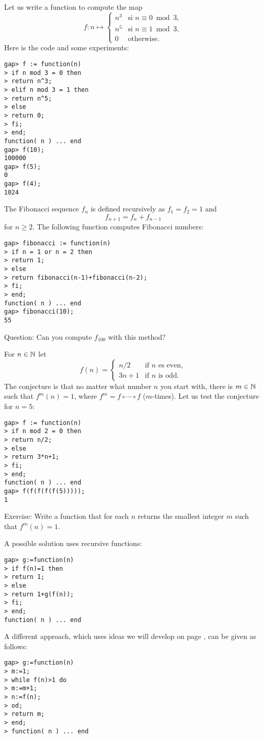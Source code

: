 \begin{example}
Let us write a function to compute the map 
\[
f\colon n\mapsto\begin{cases}
	n^3 & \text{si $n\equiv0\bmod 3$},\\
	n^5 & \text{si $n\equiv1\bmod 3$},\\
	0 & \text{otherwise}.
\end{cases}
\]
Here is the code and some experiments:
\begin{lstlisting}
gap> f := function(n)
> if n mod 3 = 0 then
> return n^3;
> elif n mod 3 = 1 then
> return n^5;
> else
> return 0;
> fi;
> end;
function( n ) ... end
gap> f(10);
100000
gap> f(5);
0
gap> f(4);
1024
\end{lstlisting}
\end{example}

\begin{example}
\label{exa:Fibonacci:1}
The Fibonacci sequence $f_n$ is defined recursively as $f_1=f_2=1$ and 
\[
f_{n+1}=f_n+f_{n-1}
\]
for $n\geq2$. The following function computes Fibonacci numbers:
\begin{lstlisting}
gap> fibonacci := function(n)
> if n = 1 or n = 2 then
> return 1;
> else
> return fibonacci(n-1)+fibonacci(n-2);
> fi;
> end;
function( n ) ... end
gap> fibonacci(10);
55
\end{lstlisting}
Question: Can you compute $f_{100}$ with this method?
\end{example}

\begin{example}
	\label{example:Collatz}
	For $n\in\mathbb{N}$ let 
	\[
		f(n)=\begin{cases}
			n/2 & \text{if $n$ es even},\\
			3n+1 & \text{if $n$ is odd}.
		\end{cases}
	\]
	The conjecture is that no matter what number $n$ you start with, there is
	$m\in\mathbb{N}$ such that $f^m(n)=1$, where $f^m=f\circ\cdots\circ f$ ($m$-times).
	Let us test the conjecture for $n=5$:
\begin{lstlisting}
gap> f := function(n)
> if n mod 2 = 0 then
> return n/2;
> else 
> return 3*n+1;
> fi;
> end;
function( n ) ... end
gap> f(f(f(f(f(5)))));
1
\end{lstlisting}
Exercise: Write a function that for each $n$ returns the smallest integer $m$ such that $f^m(n)=1$.

\medskip
A possible solution uses recursive functions:
\begin{lstlisting}
gap> g:=function(n)
> if f(n)=1 then
> return 1;
> else
> return 1+g(f(n));
> fi;
> end;
function( n ) ... end
\end{lstlisting}

A different approach, which uses ideas we will develop on page
\pageref{page:do}, can be given as follows:
\begin{lstlisting}
gap> g:=function(n)
> m:=1;
> while f(n)>1 do
> m:=m+1;
> n:=f(n);
> od;
> return m;
> end;
> function( n ) ... end
\end{lstlisting}
\end{example}



